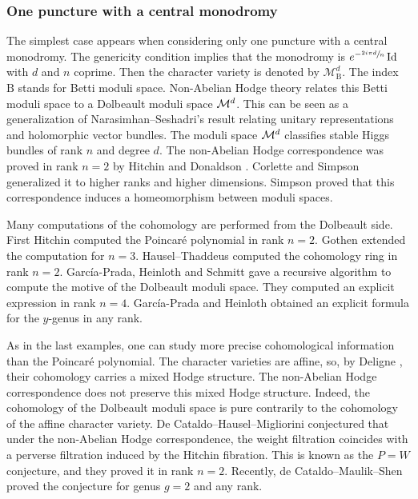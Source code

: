 \documentclass[JEP,XML,SOM,NoEqCountersInSection,Unicode,published]{cedram}
\newcommand{\NoChangel}[1]{%
\expandafter\let\csname old\string#1\endcsname=#1
\let#1=\relax
\newcommand{#1}{\mathcode`l="716C\csname old\string#1\endcsname\mathcode`l="7160 }%
}
\newcommand{\Dol}{\mathrm{Dol}}\NoChangel{\Dol}
\newcommand{\rB}{\mathrm{B}}
\theoremstyle{definition}
\theoremstyle{plain}
\DeclareMathOperator{\Id}{Id}
\begin{document}
\subsubsection{One puncture with a central monodromy}
The simplest case appears when considering only one puncture with a central monodromy. The genericity condition implies that the monodromy is $e^{-\sfrac{2 i \pi d}{n}} \Id$ with $d$ and $n$ coprime. Then the character variety is denoted by $\mathcal{M}_{\rB}^d$. The index $\rB$ stands for Betti moduli space. Non-Abelian Hodge theory relates this Betti moduli space to a Dolbeault moduli space $\mathcal{M}^d_{\Dol}$. This can be seen as a generalization of Narasimhan--Seshadri's result \cite{Narasimhan_Seshadri} relating unitary representations and holomorphic vector bundles. The moduli space $\mathcal{M}^d_{\Dol}$ classifies stable Higgs bundles of rank $n$ and degree $d$. The non-Abelian Hodge correspondence was proved in rank $n=2$ by Hitchin \cite{Hitchin87} and Donaldson \cite{Donaldson}. Corlette \cite{Corlette} and Simpson \cite{Simpson_88,Simpson1992HiggsBA} generalized it to higher ranks and higher dimensions. Simpson \cite{Simpson_94_I,Simpson_94_II} proved that this correspondence induces a homeomorphism between moduli spaces.

Many computations of the cohomology are performed from the Dolbeault side. First Hitchin \cite{Hitchin87} computed the Poincaré polynomial in rank $n=2$. Gothen \cite{Gothen} extended the computation for $n=3$. Hausel--Thaddeus \cite{Hausel_Thaddeus_03,Hausel_Thaddeus_2004} computed the cohomology ring in rank $n=2$. García-Prada, Heinloth and Schmitt \cite{Garcia_Heinloth_Schmitt} gave a recursive algorithm to compute the motive of the Dolbeault moduli space. They computed an explicit expression in rank $n=4$. García-Prada and Heinloth \cite{Garcia_Prada_Heinloth_y_genus} obtained an explicit formula for the $y$-genus in any rank.

As in the last examples, one can study more precise cohomological information than the Poincaré polynomial. The character varieties are affine, so, by Deligne \cite{Deligne_Hodge}, their cohomology carries a mixed Hodge structure. The non-Abelian Hodge correspondence does not preserve this mixed Hodge structure. Indeed, the cohomology of the Dolbeault moduli space is pure contrarily to the cohomology of the affine character variety. De Cataldo--Hausel--Migliorini \cite{de_Cataldo_Hausel_Migliorini_PW} conjectured that under the non-Abelian Hodge correspondence, the weight filtration coincides with a perverse filtration induced by the Hitchin fibration. This is known as the $P=W$ conjecture, and they proved it in rank $n=2$. Recently, de Cataldo--Maulik--Shen \cite{deCataldo_Maulik_Shen} proved the conjecture for genus $g=2$ and any rank.
\end{document}
